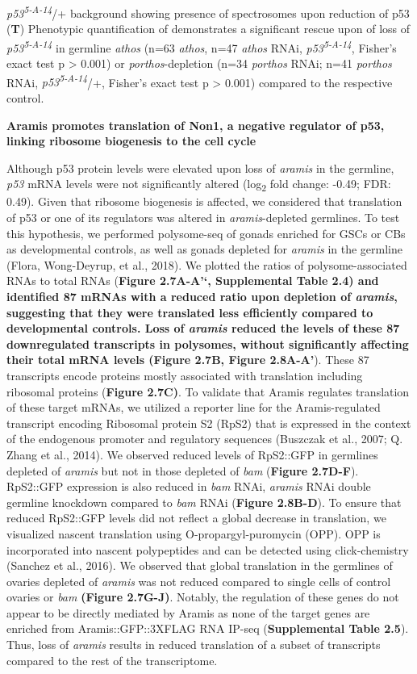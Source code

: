 \documentclass[12pt,oneside]{reedthesis}
\begin{document}
\emph{p53\textsuperscript{5-A-14}}/+ background showing presence of spectrosomes upon reduction of p53 (\textbf{T}) Phenotypic quantification of demonstrates a significant rescue upon of loss of \emph{p53\textsuperscript{5-A-14}} in germline \emph{athos} (n=63 \emph{athos}, n=47 \emph{athos} RNAi, \emph{p53\textsuperscript{5-A-14}}, Fisher's exact test p \textgreater{} 0.001) or \emph{porthos}-depletion (n=34 \emph{porthos} RNAi; n=41 \emph{porthos} RNAi, \emph{p53\textsuperscript{5-A-14}}/+, Fisher's exact test p \textgreater{} 0.001) compared to the respective control.

\textbf{\hfill\break
}

\textbf{Aramis promotes translation of Non1, a negative regulator of p53, linking ribosome biogenesis to the cell cycle}

Although p53 protein levels were elevated upon loss of \emph{aramis} in the germline, \emph{p53} mRNA levels were not significantly altered (log\textsubscript{2} fold change: -0.49; FDR: 0.49). Given that ribosome biogenesis is affected, we considered that translation of p53 or one of its regulators was altered in \emph{aramis}-depleted germlines. To test this hypothesis, we performed polysome-seq of gonads enriched for GSCs or CBs as developmental controls, as well as gonads depleted for \emph{aramis} in the germline (Flora, Wong-Deyrup, et al., 2018). We plotted the ratios of polysome-associated RNAs to total RNAs (\textbf{Figure 2.7A-A'`, Supplemental Table 2.4\textbf{) and identified 87 mRNAs with a reduced ratio upon depletion of \emph{aramis}, suggesting that they were translated less efficiently compared to developmental controls. Loss of \emph{aramis} reduced the levels of these 87 downregulated transcripts in polysomes, without significantly affecting their total mRNA levels (}Figure 2.7B, Figure 2.8A-A'}). These 87 transcripts encode proteins mostly associated with translation including ribosomal proteins (\textbf{Figure 2.7C)}. To validate that Aramis regulates translation of these target mRNAs, we utilized a reporter line for the Aramis-regulated transcript encoding Ribosomal protein S2 (RpS2) that is expressed in the context of the endogenous promoter and regulatory sequences (Buszczak et al., 2007; Q. Zhang et al., 2014). We observed reduced levels of RpS2::GFP in germlines depleted of \emph{aramis} but not in those depleted of \emph{bam} (\textbf{Figure 2.7D-F}). RpS2::GFP expression is also reduced in \emph{bam} RNAi, \emph{aramis} RNAi double germline knockdown compared to \emph{bam} RNAi (\textbf{Figure 2.8B-D}). To ensure that reduced RpS2::GFP levels did not reflect a global decrease in translation, we visualized nascent translation using O-propargyl-puromycin (OPP). OPP is incorporated into nascent polypeptides and can be detected using click-chemistry (Sanchez et al., 2016). We observed that global translation in the germlines of ovaries depleted of \emph{aramis} was not reduced compared to single cells of control ovaries or \emph{bam} \textbf{(Figure 2.7G-J)}. Notably, the regulation of these genes do not appear to be directly mediated by Aramis as none of the target genes are enriched from Aramis::GFP::3XFLAG RNA IP-seq (\textbf{Supplemental Table 2.5}). Thus, loss of \emph{aramis} results in reduced translation of a subset of transcripts compared to the rest of the transcriptome.
\end{document}

